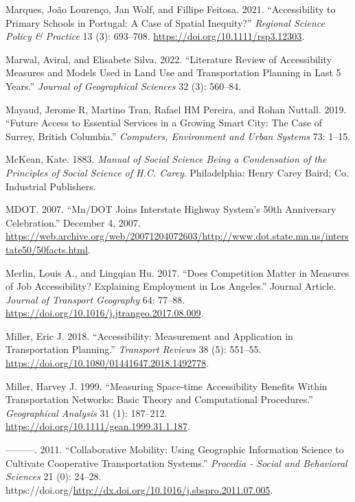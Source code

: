 \documentclass[
]{article}
\newlength{\cslhangindent}
\newenvironment{CSLReferences}[2] %
 {\begin{list}{}{%
  \setlength{\itemindent}{0pt}
  \setlength{\leftmargin}{0pt}
  \setlength{\parsep}{0pt}
  \ifodd #1
   \setlength{\leftmargin}{\cslhangindent}
   \setlength{\itemindent}{-1\cslhangindent}
  \fi
  \setlength{\itemsep}{#2\baselineskip}}}
 {\end{list}}
\begin{document}
\begin{CSLReferences}{1}{0}
Marques, João Lourenço, Jan Wolf, and Fillipe Feitosa. 2021.
{``Accessibility to Primary Schools in {Portugal}: A Case of Spatial
Inequity?''} \emph{Regional Science Policy \& Practice} 13 (3):
693--708. \url{https://doi.org/10.1111/rsp3.12303}.

Marwal, Aviral, and Elisabete Silva. 2022. {``Literature Review of
Accessibility Measures and Models Used in Land Use and Transportation
Planning in Last 5 Years.''} \emph{Journal of Geographical Sciences} 32
(3): 560--84.

Mayaud, Jerome R, Martino Tran, Rafael HM Pereira, and Rohan Nuttall.
2019. {``Future Access to Essential Services in a Growing Smart City:
The Case of Surrey, British Columbia.''} \emph{Computers, Environment
and Urban Systems} 73: 1--15.

McKean, Kate. 1883. \emph{Manual of {Social} {Science} Being a
{Condensation} of the {Principles} of {Social} {Science} of {H}.{C}.
{Carey}}. Philadelphia: Henry Carey Baird; Co. Industrial Publishers.

MDOT. 2007. {``Mn/{DOT} Joins Interstate Highway System's 50th
Anniversary Celebration.''} December 4, 2007.
\url{https://web.archive.org/web/20071204072603/http://www.dot.state.mn.us/interstate50/50facts.html}.

Merlin, Louis A., and Lingqian Hu. 2017. {``Does Competition Matter in
Measures of Job Accessibility? Explaining Employment in Los Angeles.''}
Journal Article. \emph{Journal of Transport Geography} 64: 77--88.
\url{https://doi.org/10.1016/j.jtrangeo.2017.08.009}.

Miller, Eric J. 2018. {``Accessibility: Measurement and Application in
Transportation Planning.''} \emph{Transport Reviews} 38 (5): 551--55.
\url{https://doi.org/10.1080/01441647.2018.1492778}.

Miller, Harvey J. 1999. {``Measuring Space‐time Accessibility Benefits
Within Transportation Networks: Basic Theory and Computational
Procedures.''} \emph{Geographical Analysis} 31 (1): 187--212.
\url{https://doi.org/10.1111/gean.1999.31.1.187}.

---------. 2011. {``Collaborative Mobility: Using Geographic Information
Science to Cultivate Cooperative Transportation Systems.''}
\emph{Procedia - Social and Behavioral Sciences} 21 (0): 24--28.
https://doi.org/\url{http://dx.doi.org/10.1016/j.sbspro.2011.07.005}.


\end{CSLReferences}
\end{document}
